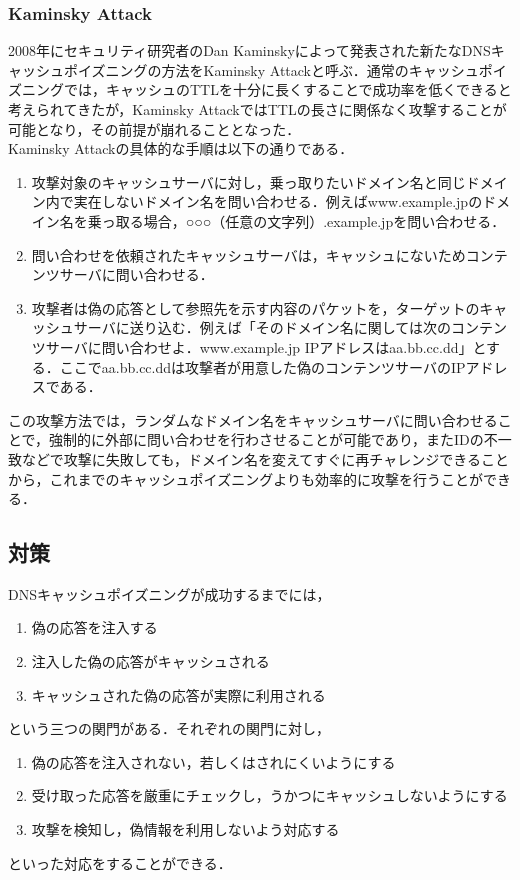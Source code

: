 \subsubsection{Kaminsky Attack}
2008年にセキュリティ研究者のDan Kaminskyによって発表された新たなDNSキャッシュポイズニングの方法をKaminsky Attackと呼ぶ．\cite{kaminsky}通常のキャッシュポイズニングでは，キャッシュのTTLを十分に長くすることで成功率を低くできると考えられてきたが，Kaminsky AttackではTTLの長さに関係なく攻撃することが可能となり，その前提が崩れることとなった．\\
Kaminsky Attackの具体的な手順は以下の通りである．

\begin{enumerate}
	\item 攻撃対象のキャッシュサーバに対し，乗っ取りたいドメイン名と同じドメイン内で実在しないドメイン名を問い合わせる．例えばwww.example.jpのドメイン名を乗っ取る場合，○○○（任意の文字列）.example.jpを問い合わせる．
	\item 問い合わせを依頼されたキャッシュサーバは，キャッシュにないためコンテンツサーバに問い合わせる．
	\item 攻撃者は偽の応答として参照先を示す内容のパケットを，ターゲットのキャッシュサーバに送り込む．例えば「そのドメイン名に関しては次のコンテンツサーバに問い合わせよ．www.example.jp IPアドレスはaa.bb.cc.dd」とする．ここでaa.bb.cc.ddは攻撃者が用意した偽のコンテンツサーバのIPアドレスである．
\end{enumerate}

この攻撃方法では，ランダムなドメイン名をキャッシュサーバに問い合わせることで，強制的に外部に問い合わせを行わさせることが可能であり，またIDの不一致などで攻撃に失敗しても，ドメイン名を変えてすぐに再チャレンジできることから，これまでのキャッシュポイズニングよりも効率的に攻撃を行うことができる．

\subsection{対策}
DNSキャッシュポイズニングが成功するまでには，
\begin{enumerate}
	\item 偽の応答を注入する
	\item 注入した偽の応答がキャッシュされる
	\item キャッシュされた偽の応答が実際に利用される
\end{enumerate}
という三つの関門がある．それぞれの関門に対し，
\begin{enumerate}
	\item 偽の応答を注入されない，若しくはされにくいようにする
	\item 受け取った応答を厳重にチェックし，うかつにキャッシュしないようにする
	\item 攻撃を検知し，偽情報を利用しないよう対応する
\end{enumerate}
といった対応をすることができる．\cite{jrps}

